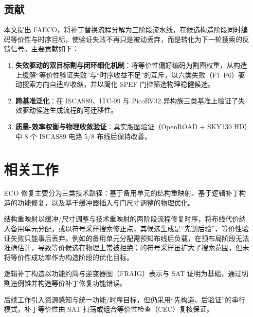 \documentclass[journal]{IEEEtran}
\begin{document}
\subsection{贡献}

本文提出 FAECO，将补丁替换流程分解为三阶段流水线，在候选构造阶段同时编码等价性与时序目标，使验证失败不再只是被动丢弃，而是转化为下一轮搜索的反馈信号。主要贡献如下：

\begin{enumerate}
  \item \textbf{失效驱动的双目标割与闭环细化机制}：将等价性偏好编码为割图权重，从构造上缓解“等价性验证失败”与“时序收益不足”的互斥，以六类失败（F1--F6）驱动搜索方向自适应收缩，并以简化 SPEF 门控筛选物理稳健候选。
  \item \textbf{跨基准泛化}：在 ISCAS89、ITC-99 与 PicoRV32 异构族三类基准上验证了失效驱动候选生成流程的可迁移性。
  \item \textbf{质量-效率权衡与物理收敛验证}：真实版图验证（OpenROAD + SKY130 HD）中 8 个 ISCAS89 电路 5/8 布线后保持改善。
\end{enumerate}

\section{相关工作}

ECO 修复主要分为三类技术路径：基于备用单元的结构重映射、基于逻辑补丁构造的功能修复，以及基于缓冲器插入与门尺寸调整的物理优化。

结构重映射以缓冲/尺寸调整与技术重映射的两阶段流程修复时序，将布线代价纳入备用单元分配\cite{ho2010eco,ho2012treco}，或以符号采样搜索修正点\cite{kravets2019symbolic}，其候选生成是“先割后验”，等价性验证失败只能事后丢弃。例如\cite{ho2010eco}的备用单元分配需预知布线后负载，在预布局阶段无法准确估计，导致等价候选在物理上常被拒绝；\cite{kravets2019symbolic}的符号采样虽扩大了搜索范围，但未将等价性成功率作为构造阶段的优化目标。

逻辑补丁构造以功能约简与逆变器图（FRAIG）表示与 SAT 证明为基础，通过切割违例锥并构造等价补丁修复功能错误\cite{jiang2010fraig,jiang2016resource}。

后续工作引入资源感知\cite{jiang2016resource}与统一功能/时序目标\cite{lin2011simult,luo2016unified}，但仍采用“先构造、后验证”的串行模式，补丁等价性由 SAT 扫荡或组合等价性检查（CEC）复核保证\cite{mishchenko2006sat,zhong2024stp}。
\end{document}
